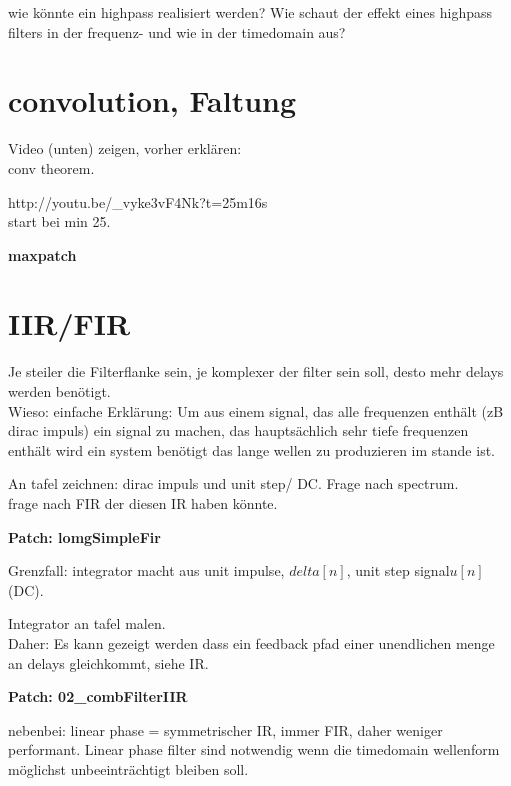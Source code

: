 wie könnte ein highpass realisiert werden? Wie schaut der effekt eines highpass filters in der frequenz- und wie in der timedomain aus?


\section{convolution, Faltung}

Video (unten) zeigen, vorher erklären: \\

conv theorem.

http://youtu.be/\_vyke3vF4Nk?t=25m16s \\
start bei min 25.

\textbf{maxpatch}




\section {IIR/FIR}

Je steiler die Filterflanke sein, je komplexer der filter sein soll, desto mehr delays werden benötigt.\\

Wieso: einfache Erklärung: Um aus einem signal, das alle frequenzen enthält (zB dirac impuls) ein signal zu machen, das hauptsächlich sehr tiefe frequenzen enthält wird ein system benötigt das \glqq{}lange wellen\grqq{} zu produzieren im stande ist. 

An tafel zeichnen: dirac impuls und unit step/ DC. Frage nach spectrum.\\

frage nach FIR der diesen IR haben könnte.

\textbf{Patch: lomgSimpleFir}

Grenzfall: integrator macht aus unit impulse, \(delta [n]\), unit step signal\(u[n]\)(DC).

Integrator an tafel malen.\\

Daher:
Es kann gezeigt werden dass ein feedback pfad einer unendlichen menge an delays gleichkommt, siehe IR.

\textbf{Patch: 02\_combFilterIIR}

nebenbei:
linear phase = symmetrischer IR, immer FIR, daher weniger performant.
Linear phase filter sind notwendig wenn die timedomain wellenform möglichst unbeeinträchtigt bleiben soll.

